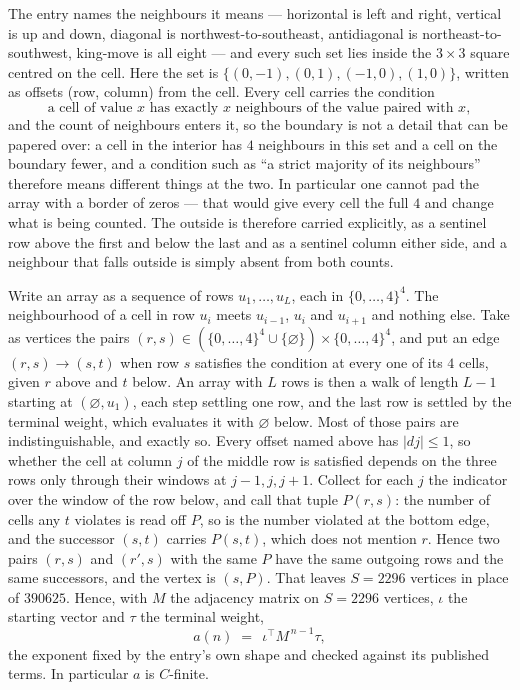 \documentclass[11pt,a4paper]{article}
\theoremstyle{plain}
\theoremstyle{definition}
\begin{document}
The entry names the neighbours it means --- horizontal is left and right, vertical is up and
down, diagonal is northwest-to-southeast, antidiagonal is northeast-to-southwest, king-move is
all eight --- and every such set lies inside the $3\times3$ square centred on the cell. Here
the set is $\{(0,-1), (0,1), (-1,0), (1,0)\}$, written as offsets (row, column) from the cell. Every cell carries
the condition
\[
\text{a cell of value }x\text{ has exactly }x\text{ neighbours of the value paired with }x,
\]
and the count of neighbours enters it, so the boundary is not a detail that can be papered
over: a cell in the interior has $4$ neighbours in this set and a cell on the boundary
fewer, and a condition such as ``a strict majority of its neighbours'' therefore means
different things at the two. In particular one cannot pad the array with a border of zeros ---
that would give every cell the full $4$ and change what is being counted. The outside is
therefore carried
explicitly, as a sentinel row above the first and below the last and as a sentinel column
either side, and a neighbour that falls outside is simply absent from both counts.

Write an array as a sequence of rows $u_1,\dots,u_L$, each in
$\{0,\dots,4\}^{4}$. The neighbourhood of a cell in row $u_i$ meets $u_{i-1}$,
$u_i$ and $u_{i+1}$ and nothing else. Take as vertices the pairs
$(r,s)\in(\{0,\dots,4\}^{4}\cup\{\varnothing\})\times\{0,\dots,4\}^{4}$,
and put an edge $(r,s)\to(s,t)$ when row $s$ satisfies the condition at every one of its
$4$ cells, given $r$ above and $t$ below. An array with $L$ rows is then a walk of length
$L-1$ starting at $(\varnothing,u_1)$, each step settling one row, and the last row is
settled by the terminal weight, which evaluates it with $\varnothing$ below. Most of those pairs are indistinguishable, and exactly so. Every offset named above has $|dj|\le 1$, so whether the cell at column $j$ of the middle row is satisfied depends on the three rows only through their windows at $j-1,j,j+1$. Collect for each $j$ the indicator over the window of the row below, and call that tuple $P(r,s)$: the number of cells any $t$ violates is read off $P$, so is the number violated at the bottom edge, and the successor $(s,t)$ carries $P(s,t)$, which does not mention $r$. Hence two pairs $(r,s)$ and $(r',s)$ with the same $P$ have the same outgoing rows and the same successors, and the vertex is $(s,P)$. That leaves $S=2296$ vertices in place of $390625$. Hence,
with $M$ the adjacency matrix on $S=2296$ vertices, $\iota$ the starting vector and $\tau$ the
terminal weight,
\[
a(n)\;=\;\,\iota^{\!\top}M^{\,n-1}\tau ,
\]
the exponent fixed by the entry's own shape and checked against its published terms. In
particular $a$ is $C$-finite.
\end{document}
